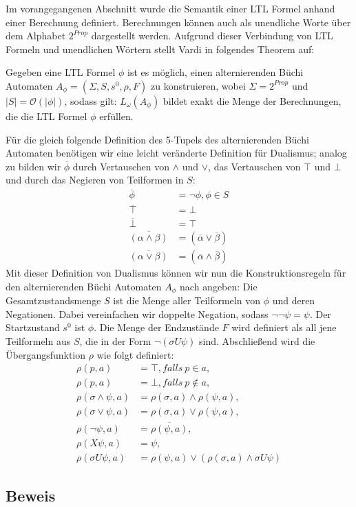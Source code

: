 Im vorangegangenen Abschnitt wurde die Semantik einer LTL Formel anhand einer Berechnung definiert. Berechnungen können auch als unendliche Worte über dem Alphabet $2^{Prop}$ dargestellt werden\cite{vardi+96}. Aufgrund dieser Verbindung von LTL Formeln und unendlichen Wörtern stellt Vardi in \cite{vardi+96} folgendes Theorem auf:
\begin{theorem}
    Gegeben eine LTL Formel $\phi$ ist es möglich, einen alternierenden Büchi Automaten $A_\phi = (\Sigma, S, s^0, \rho, F)$ zu konstruieren, wobei $\Sigma = 2^{Prop}$ und $|S| = \mathcal{O}(|\phi|)$, sodass gilt: $L_\omega(A_\phi)$ bildet exakt die Menge der Berechnungen, die die LTL Formel $\phi$ erfüllen.
\end{theorem}
Für die gleich folgende Definition des 5-Tupels des alternierenden Büchi Automaten benötigen wir eine leicht veränderte Definition für Dualismus; analog zu \cite{vardi+96} bilden wir $\overline{\phi}$ durch Vertauschen von $\land$ und $\lor$, das Vertauschen von $\top$ und $\bot$ und durch das Negieren von Teilformen in $S$:
\begin{equation}
\label{aba-zu-ltl:dualismus}
\begin{split}
    \overline{\phi} &= \lnot\phi, \phi \in S\\
    \overline{\top} &= \bot\\
    \overline{\bot} &= \top\\
    \overline{(\alpha \land \beta)} &= (\overline{\alpha} \lor \overline{\beta})\\
    \overline{(\alpha \lor \beta)} &= (\overline{\alpha} \land \overline{\beta})
\end{split}
\end{equation}
Mit dieser Definition von Dualismus können wir nun die Konstruktionsregeln für den alternierenden Büchi Automaten $A_\phi$ nach \cite{vardi+96} angeben: Die Gesamtzustandsmenge $S$ ist die Menge aller Teilformeln von $\phi$ und deren Negationen. Dabei vereinfachen wir doppelte Negation, sodass $\lnot\lnot\psi = \psi$. Der Startzustand $s^0$ ist $\phi$. 
Die Menge der Endzustände $F$ wird definiert als all jene Teilformeln aus $S$, die in der Form $\lnot(\sigma U\psi)$ sind. Abschließend wird die Übergangsfunktion $\rho$ wie folgt definiert:
\begin{equation}
\label{aba-zu-ltl:transitionsfunktion}
\begin{split}
    \rho(p, a) &= \top, falls \ p \in a,\\
    \rho(p, a) &= \bot, falls \ p \not\in a,\\
    \rho(\sigma \land \psi, a) &= \rho(\sigma, a) \land \rho(\psi, a),\\
    \rho(\sigma \lor \psi, a) &= \rho(\sigma, a) \lor \rho(\psi, a),\\
    \rho(\lnot\psi, a) &= \overline{\rho(\psi, a)},\\
    \rho(X\psi, a) &= \psi,\\
    \rho(\sigma U\psi, a) &= \rho(\psi, a) \lor (\rho(\sigma, a) \land \sigma U\psi)
\end{split}
\end{equation}


\subsection{Beweis}